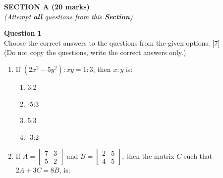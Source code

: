 \begin{center}
   \large
   \textbf{SECTION A (20 marks)}\\
   \vspace{5mm}
   \normalsize
   \textit{(Attempt \textbf{all} questions from this \textbf{Section})}
\end{center}
\par
\noindent
\textbf{Question 1}\\
Choose the correct answers to the questions from the given options. \hfill [7]\\
(Do not copy the questions, write the correct answers only.)
\par
\vspace{2mm}
\begin{enumerate}[label=(\roman*)]

    \item If $(2x^2 - 5y^2) : xy = 1:3$, then $x:y$ is: 

        \begin{multicols}{2}
        \begin{enumerate}[label=(\alph*)]
            \item 3:2 
            \item -5:3
            \item 5:3
            \item -3:2 
        \end{enumerate}
        \end{multicols}

    \newpage
    \item If $A = \begin{bmatrix*} 7 & 3 \\ 5 & 2 \end{bmatrix*}$ and 
        $B = \begin{bmatrix*} 2 & 5 \\ 4 & 5 \end{bmatrix*}$, then the 
        matrix $C$ such that $2A + 3C = 8B$, is:


\end{enumerate}

